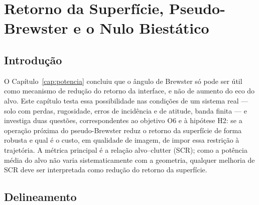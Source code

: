 \documentclass[12pt,a4paper,oneside]{book}
\theoremstyle{remark}
\theoremstyle{plain}
\theoremstyle{definition}
\begin{document}
\chapter{Retorno da Superfície, Pseudo-Brewster e o Nulo Biestático}
\label{cap:superficie}

\section{Introdução}
\label{sec:sup_intro}

O Capítulo~\ref{cap:potencia} concluiu que o ângulo de Brewster só pode ser útil
como mecanismo de redução do retorno da interface, e não de aumento do eco do
alvo. Este capítulo testa essa possibilidade nas condições de um sistema real
--- solo com perdas, rugosidade, erros de incidência e de atitude, banda
finita --- e investiga duas questões, correspondentes ao objetivo O6 e à
hipótese H2: se a operação próxima do pseudo-Brewster reduz o retorno da superfície
de forma robusta e qual é o custo, em qualidade de imagem, de impor essa restrição
à trajetória. A métrica principal é a relação
alvo--clutter (SCR); como a potência média do alvo não varia sistematicamente
com a geometria, qualquer melhoria de SCR deve ser interpretada como redução do
retorno da superfície.

\section{Delineamento}
\label{sec:sup_delineamento}
\end{document}

